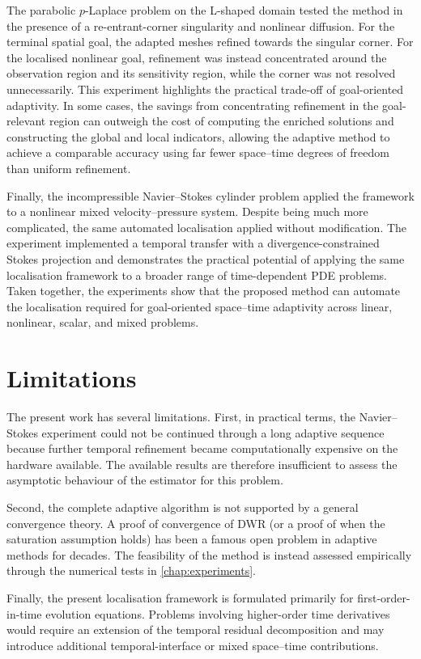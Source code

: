The parabolic $p$-Laplace problem on the L-shaped domain tested the method in the presence of a re-entrant-corner singularity and nonlinear diffusion. For the terminal spatial goal, the adapted meshes refined towards the singular corner. For the localised nonlinear goal, refinement was instead concentrated around the observation region and its sensitivity region, while the corner was not resolved unnecessarily. This experiment highlights the practical trade-off of goal-oriented adaptivity. In some cases, the savings from concentrating refinement in the goal-relevant region can outweigh the cost of computing the enriched solutions and constructing the global and local indicators, allowing the adaptive method to achieve a comparable accuracy using far fewer space--time degrees of freedom than uniform refinement. 

Finally, the incompressible Navier--Stokes cylinder problem applied the framework to a nonlinear mixed velocity--pressure system. Despite being much more complicated, the same automated localisation applied without modification. The experiment implemented a temporal transfer with a divergence-constrained Stokes projection and demonstrates the practical potential of applying the same localisation framework to a broader range of time-dependent PDE problems.
Taken together, the experiments show that the proposed method can automate the localisation required for goal-oriented space--time adaptivity across linear, nonlinear, scalar, and mixed problems. 


\section{Limitations}

The present work has several limitations. First, in practical terms, the Navier--Stokes experiment could not be continued through a long adaptive sequence because further temporal refinement became computationally expensive on the hardware available. The available results are therefore insufficient to assess the asymptotic behaviour of the estimator for this problem.

Second, the complete adaptive algorithm is not supported by a general convergence theory. A proof of convergence of DWR (or a proof of when the saturation assumption holds) has been a famous open problem in adaptive methods for decades. The feasibility of the method is instead assessed empirically through the numerical tests in \cref{chap:experiments}. 

Finally, the present localisation framework is formulated primarily for first-order-in-time evolution equations. Problems involving higher-order time derivatives would require an extension of the temporal residual decomposition and may introduce additional temporal-interface or mixed space--time contributions. 


